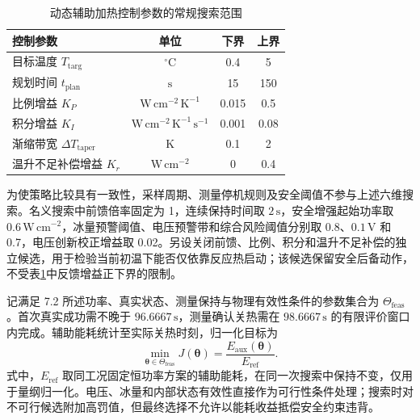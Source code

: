 \documentclass[bwprint]{gmcmthesis}
\numberwithin{figure}{section}
\begin{document}
\begin{table}[htbp]
    \centering
    \caption{动态辅助加热控制参数的常规搜索范围}
    \vspace{0.3cm}
    \label{B7-control-bounds}
    \renewcommand{\arraystretch}{1.5}
    \begin{tabular}{l c c c}
        \toprule
        控制参数 & 单位 & 下界 & 上界 \\
        \midrule
        目标温度 \(T_{\mathrm{targ}}\) & \(^\circ\mathrm C\) & 0.4 & 5 \\
        规划时间 \(t_{\mathrm{plan}}\) & \(\mathrm s\) & 15 & 150 \\
        比例增益 \(K_P\) & \(\mathrm{W\,cm^{-2}\,K^{-1}}\) & 0.015 & 0.5 \\
        积分增益 \(K_I\) & \(\mathrm{W\,cm^{-2}\,K^{-1}\,s^{-1}}\) & 0.001 & 0.08 \\
        渐缩带宽 \(\Delta T_{\mathrm{taper}}\) & \(\mathrm K\) & 0.1 & 2 \\
        温升不足补偿增益 \(K_r\) & \(\mathrm{W\,cm^{-2}}\) & 0 & 0.4 \\
        \bottomrule
    \end{tabular}
\end{table}

为使策略比较具有一致性，采样周期、测量停机规则及安全阈值不参与上述六维搜索。名义搜索中前馈倍率固定为 1，连续保持时间取 \(2\,\mathrm s\)，安全增强起始功率取 \(0.6\,\mathrm{W\,cm^{-2}}\)，冰量预警阈值、电压预警带和综合风险阈值分别取 0.8、\(0.1\,\mathrm V\) 和 0.7，电压创新校正增益取 0.02。另设关闭前馈、比例、积分和温升不足补偿的独立候选，用于检验当前初温下能否仅依靠反应热启动；该候选保留安全后备动作，不受表\ref{B7-control-bounds}中反馈增益正下界的限制。

记满足 7.2 所述功率、真实状态、测量保持与物理有效性条件的参数集合为 \(\Theta_{\mathrm{feas}}\)。首次真实成功需不晚于 \(96.6667\,\mathrm s\)，测量确认关热需在 \(98.6667\,\mathrm s\) 的有限评价窗口内完成。辅助能耗统计至实际关热时刻，归一化目标为
\begin{equation}
\min_{\boldsymbol{\theta}\in\Theta_{\mathrm{feas}}}
J(\boldsymbol{\theta})
=\frac{E_{\mathrm{aux}}(\boldsymbol{\theta})}{E_{\mathrm{ref}}}.
\tag{7-37}\label{eq:q4:solver_objective}
\end{equation}
式中，\(E_{\mathrm{ref}}\) 取同工况固定恒功率方案的辅助能耗，在同一次搜索中保持不变，仅用于量纲归一化。电压、冰量和内部状态有效性直接作为可行性条件处理；搜索时对不可行候选附加高罚值，但最终选择不允许以能耗收益抵偿安全约束违背。
\end{document}
